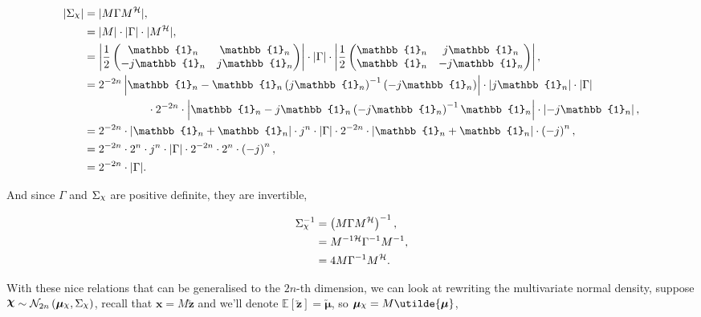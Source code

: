 \documentclass[honours,12pt]{unswthesis}
\newcommand{\E}{\mathbb{E}}
\newcommand{\ct}{\mathcal{H}}
\DeclareRobustCommand{\Chi}{{\mathpalette\irchi\relax}}
\newcommand{\irchi}[2]{\raisebox{\depth}{$#1\chi$}} %
\numberwithin{equation}{section}
\begin{document}
\begin{align*}
	| \Sigma_{\Chi} | &= | M \Gamma M^{\ct} |,\\
	&= | M | \cdot | \Gamma | \cdot | M^{\ct} |,\\
	&= \left| \frac{1}{2} 
		\begin{pmatrix}
			\mathbb{1}_{n} & \mathbb{1}_{n} \\
			- j \mathbb{1}_{n} & j \mathbb{1}_{n}
		\end{pmatrix}
		\right| \cdot
		| \Gamma | \cdot
		\left| \frac{1}{2} 
		\begin{pmatrix}
			\mathbb{1}_{n} & j \mathbb{1}_{n} \\
			\mathbb{1}_{n} & - j \mathbb{1}_{n}
		\end{pmatrix}
		\right|,\\
	&= 2^{- 2 n} 
		\left| \mathbb{1}_{n} - \mathbb{1}_{n} \left( j \mathbb{1}_{n} \right)^{-1} \left( - j \mathbb{1}_{n} \right) \right| \cdot
		| j \mathbb{1}_{n} | \cdot
		| \Gamma | \\
	&\hspace{2cm} \cdot 2^{- 2 n} \cdot
		\left| \mathbb{1}_{n} - j \mathbb{1}_{n} \left( - j \mathbb{1}_{n} \right)^{-1} \mathbb{1}_{n} \right| \cdot
		\left| - j \mathbb{1}_{n} \right|, \\
	&= 2^{- 2 n} \cdot
		\left| \mathbb{1}_{n} + \mathbb{1}_{n} \right| \cdot
		j^{n} \cdot
		| \Gamma | \cdot
		2^{- 2 n} \cdot
		\left| \mathbb{1}_{n} + \mathbb{1}_{n} \right| \cdot
		\left( - j \right)^{n},\\
	&= 2^{- 2 n} \cdot 2^{n} \cdot j^{n} \cdot | \Gamma | \cdot 2^{- 2 n} \cdot 2^{n} \cdot \left( - j \right)^{n},\\
	&= 2^{- 2 n} \cdot | \Gamma |.
\end{align*}

And since $\Gamma$ and $\Sigma_{\Chi}$ are positive definite, they are invertible,

\begin{align*}
	\Sigma_{\Chi}^{-1} &= \left( M \Gamma M^{\ct} \right)^{-1},\\
	&= M^{-1 \ct} \Gamma^{-1} M^{-1},\\
	&= 4 M \Gamma^{-1} M^{\ct}.
\end{align*}

\noindent With these nice relations that can be generalised to the $2n$-th dimension, we can look at rewriting the multivariate normal density, suppose $\bm{\Chi} \sim \mathcal{N}_{2n} \left( \bm{\mu}_{\Chi}, \Sigma_{\Chi} \right)$, recall that $\mathbf{x} = M \utilde{\mathbf{z}}$ and we'll denote $\E \left[ \utilde{\mathbf{z}} \right] = \utilde{\bm{\mu}}$, so $\bm{\mu}_{\Chi} = M \utilde{\bm{\mu}}$,
\end{document}
